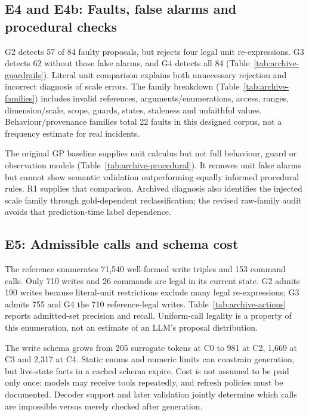 \subsection{E4 and E4b: Faults, false alarms and procedural checks}



G2 detects 57 of 84 faulty proposals, but rejects four legal unit re-expressions.
G3 detects 62 without those false alarms, and G4 detects all 84
(Table~\ref{tab:archive-guardrails}). Literal unit comparison explains both
unnecessary rejection and incorrect diagnosis of scale errors. The family
breakdown (Table~\ref{tab:archive-families}) includes invalid references,
arguments/enumerations, access, ranges, dimension/scale, scope, guards, states,
staleness and unfaithful values. Behaviour/provenance families total 22 faults
in this designed corpus, not a frequency estimate for real incidents.

The original GP baseline supplies unit calculus but not full behaviour, guard
or observation models (Table~\ref{tab:archive-procedural}). It removes unit
false alarms but cannot show semantic validation outperforming equally informed
procedural rules. R1 supplies that comparison. Archived diagnosis also identifies
the injected scale family through gold-dependent reclassification; the revised
raw-family audit avoids that prediction-time label dependence.

\subsection{E5: Admissible calls and schema cost}

The reference enumerates 71,540 well-formed write triples and 153 command calls.
Only 710 writes and 26 commands are legal in its current state. G2 admits 190
writes because literal-unit restrictions exclude many legal re-expressions;
G3 admits 755 and G4 the 710 reference-legal writes. Table~\ref{tab:archive-actions}
reports admitted-set precision and recall. Uniform-call legality is a property
of this enumeration, not an estimate of an LLM's proposal distribution.

The write schema grows from 205 surrogate tokens at C0 to 981 at C2, 1,669 at
C3 and 2,317 at C4. Static enums and numeric limits can constrain generation,
but live-state facts in a cached schema expire. Cost is not assumed to be paid
only once: models may receive tools repeatedly, and refresh policies must be
documented. Decoder support and later validation jointly determine which calls
are impossible versus merely checked after generation.

